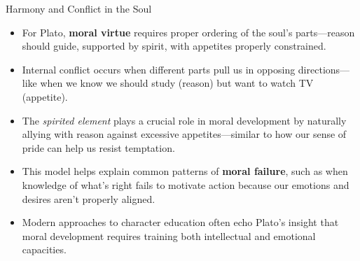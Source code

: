 \documentclass[aspectratio=169]{beamer}
\begin{document}
\begin{frame}{Harmony and Conflict in the Soul}
\begin{itemize}
\item For Plato, \textbf{moral virtue} requires proper ordering of the soul's parts—reason should guide, supported by spirit, with appetites properly constrained.
\item Internal conflict occurs when different parts pull us in opposing directions—like when we know we should study (reason) but want to watch TV (appetite).
\item The \emph{spirited element} plays a crucial role in moral development by naturally allying with reason against excessive appetites—similar to how our sense of pride can help us resist temptation.
\item This model helps explain common patterns of \textbf{moral failure}, such as when knowledge of what's right fails to motivate action because our emotions and desires aren't properly aligned.
\item Modern approaches to character education often echo Plato's insight that moral development requires training both intellectual and emotional capacities.
\end{itemize}
\end{frame}
\end{document}
